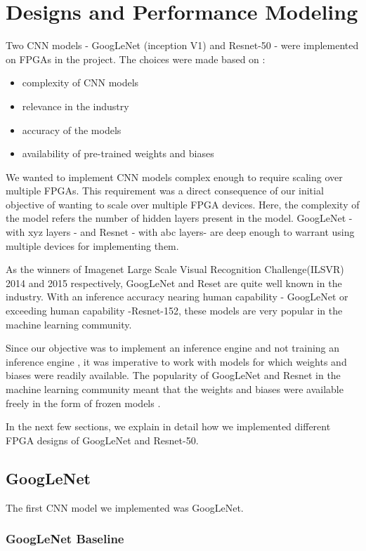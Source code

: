 \chapter{Designs and Performance Modeling}

Two CNN models - GoogLeNet (inception V1) and Resnet-50 - were implemented on FPGAs in the project. The choices were made based on :  
\begin{itemize}
  \item complexity of CNN models
  \item relevance in the industry
  \item accuracy of the models
  \item availability of pre-trained weights and biases
\end{itemize}  
We wanted to implement CNN models complex enough to require scaling over multiple FPGAs. This requirement was a direct consequence of our initial objective of wanting to scale over multiple FPGA devices. Here, the complexity of the model refers the number of hidden layers present in the model. GoogLeNet - with  xyz layers - and Resnet - with abc  layers- are deep enough to warrant using multiple devices for implementing them.

As the winners of Imagenet Large Scale Visual Recognition Challenge(ILSVR) 2014 and 2015 respectively, GoogLeNet and Reset are quite well known in the industry. With an inference accuracy nearing human capability - GoogLeNet or exceeding human capability -Resnet-152, these models are very popular in the machine learning community. 

Since our objective was to implement an inference engine and not training an inference engine , it was imperative to work with models for which weights and biases were readily available. The popularity of GoogLeNet and Resnet in the machine learning community meant that the weights and biases were available freely in the form of frozen models .

In the next few sections, we explain in detail how we implemented different FPGA designs of GoogLeNet and Resnet-50.



\section{GoogLeNet}

The first CNN model we implemented was GoogLeNet. 
\subsection{GoogLeNet Baseline}
